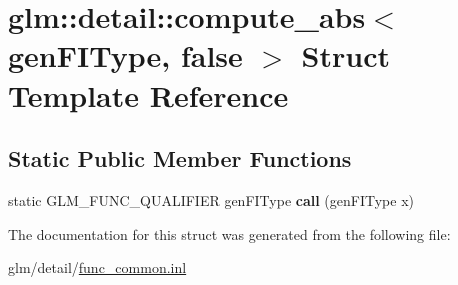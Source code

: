 \hypertarget{structglm_1_1detail_1_1compute__abs_3_01genFIType_00_01false_01_4}{\section{glm\-:\-:detail\-:\-:compute\-\_\-abs$<$ gen\-F\-I\-Type, false $>$ Struct Template Reference}
\label{structglm_1_1detail_1_1compute__abs_3_01genFIType_00_01false_01_4}
}
\subsection*{Static Public Member Functions}
\begin{DoxyCompactItemize}
\item 
\hypertarget{structglm_1_1detail_1_1compute__abs_3_01genFIType_00_01false_01_4_acc50915fdea0a19f047f019081c56dcc}{static G\-L\-M\-\_\-\-F\-U\-N\-C\-\_\-\-Q\-U\-A\-L\-I\-F\-I\-E\-R gen\-F\-I\-Type {\bfseries call} (gen\-F\-I\-Type x)}\label{structglm_1_1detail_1_1compute__abs_3_01genFIType_00_01false_01_4_acc50915fdea0a19f047f019081c56dcc}

\end{DoxyCompactItemize}


The documentation for this struct was generated from the following file\-:\begin{DoxyCompactItemize}
\item 
glm/detail/\hyperlink{func__common_8inl}{func\-\_\-common.\-inl}\end{DoxyCompactItemize}
